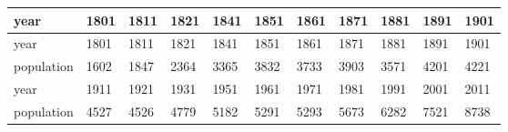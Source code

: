 \documentclass{article}
\begin{document}
\begin{tabular}{lllllllllll}
\toprule
year & 1801 & 1811 & 1821 & 1841 & 1851 & 1861 & 1871 & 1881 & 1891 & 1901 \\
\midrule
year & 1801 & 1811 & 1821 & 1841 & 1851 & 1861 & 1871 & 1881 & 1891 & 1901 \\
population & 1602 & 1847 & 2364 & 3365 & 3832 & 3733 & 3903 & 3571 & 4201 & 4221 \\
year & 1911 & 1921 & 1931 & 1951 & 1961 & 1971 & 1981 & 1991 & 2001 & 2011 \\
population & 4527 & 4526 & 4779 & 5182 & 5291 & 5293 & 5673 & 6282 & 7521 & 8738 \\
\bottomrule
\end{tabular}
\end{document}
